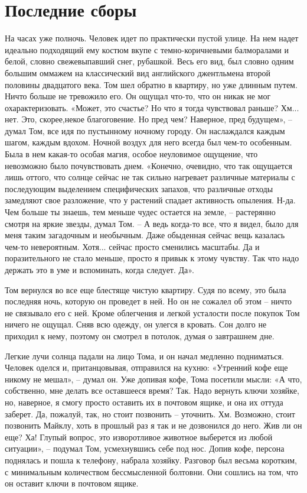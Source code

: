 \chapter{Последние сборы}
\lettrine{Н}{}а часах уже полночь. Человек идет по практически пустой улице. На нем надет идеально подходящий ему костюм вкупе с темно-коричневыми балморалами и белой, словно свежевыпавший снег, рубашкой. Весь его вид, был словно одним большим оммажем на классический вид английского джентльмена второй половины двадцатого века. Том шел обратно в квартиру, но уже длинным путем. Ничто больше не тревожило его. Он ощущал что-то, что он никак не мог охарактеризовать. «Может, это счастье? Но что я тогда чувствовал раньше? Хм... нет. Это, скорее,некое благоговение. Но пред чем? Наверное, пред будущем», – думал Том, все идя по пустынному ночному городу. Он наслаждался каждым шагом, каждым вдохом. Ночной воздух для него всегда был чем-то особенным. Была в нем какая-то особая магия, особое неуловимое ощущение, что невозможно было почувствовать днем. «Конечно, очевидно, что так ощущается лишь оттого, что солнце сейчас не так сильно нагревает различные материалы с последующим выделением специфических запахов, что различные отходы замедляют свое разложение, что у растений спадает активность опыления. Н-да. Чем больше ты знаешь, тем меньше чудес остается на земле, – растерянно смотря на яркие звезды, думал Том. – А ведь когда-то все, что я видел, было для меня таким загадочным и необычным. Даже обыденная сейчас вещь казалась чем-то невероятным. Хотя... сейчас просто сменились масштабы. Да и поразительного не стало меньше, просто я привык к этому чувству. Так что надо держать это в уме и вспоминать, когда следует. Да».

Том вернулся во все еще блестяще чистую квартиру. Судя по всему, это была последняя ночь, которую он проведет в ней. Но он не сожалел об этом – ничто не связывало его с ней. Кроме облегчения и легкой усталости после покупок Том ничего не ощущал. Сняв всю одежду, он улегся в кровать. Сон долго не приходил к нему, поэтому он смотрел в потолок, думая о завтрашнем дне. 

Легкие лучи солнца падали на лицо Тома, и он начал медленно подниматься. Человек оделся и, пританцовывая, отправился на кухню: «Утренний кофе еще никому не мешал», – думал он. Уже допивая кофе, Тома посетили мысли: «А что, собственно, мне делать все оставшееся время? Так. Надо вернуть ключи хозяйке, но, наверное, я смогу просто оставить их в почтовом ящике, и она их оттуда заберет. Да, пожалуй, так, но стоит позвонить – уточнить. Хм. Возможно, стоит позвонить Майклу, хоть в прошлый раз я так и не дозвонился до него. Жив ли он еще? Ха! Глупый вопрос, это изворотливое животное выберется из любой ситуации», – подумал Том, усмехнувшись себе под нос. Допив кофе, персона поднялась и пошла к телефону, набрала хозяйку. Разговор был весьма коротким, с минимальным количеством бессмысленной болтовни. Они сошлись на том, что он оставит ключи в почтовом ящике.

